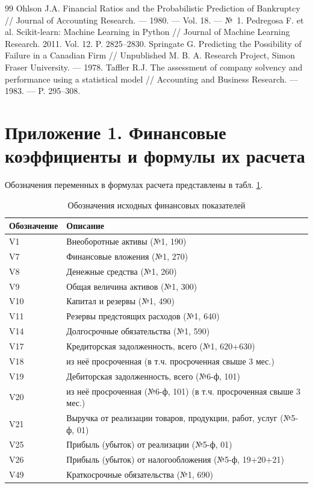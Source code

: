 \documentclass[14pt,a4paper]{extarticle}
\begin{document}
\begin{thebibliography}{99}
 Ohlson J.A. Financial Ratios and the Probabilistic Prediction of Bankruptcy // Journal of Accounting Research. --- 1980. --- Vol. 18. --- №~1.
 Pedregosa F. et al. Scikit-learn: Machine Learning in Python // Journal of Machine Learning Research. 2011. Vol. 12. P. 2825–2830.
 Springate G. Predicting the Possibility of Failure in a Canadian Firm // Unpublished M. B. A. Research Project, Simon Fraser University. --- 1978.
 Taffler R.J. The assessment of company solvency and performance using a statistical model // Accounting and Business Research. --- 1983. --- P. 295--308.
\end{thebibliography}

\clearpage

\appendix
\section*{Приложение 1. Финансовые коэффициенты и формулы их расчета}

Обозначения переменных в формулах расчета представлены в табл. \ref{tab:app1}.

\begin{table}[H]
\centering
\caption{Обозначения исходных финансовых показателей}
\label{tab:app1}
\small
\begin{tabular}{l|l}
\toprule
Обозначение & Описание \\
\midrule
V1 & Внеоборотные активы (№1, 190) \\
V7 & Финансовые вложения (№1, 270) \\
V8 & Денежные средства (№1, 260) \\
V9 & Общая величина активов (№1, 300) \\
V10 & Капитал и резервы (№1, 490) \\
V11 & Резервы предстоящих расходов (№1, 640) \\
V14 & Долгосрочные обязательства (№1, 590) \\
V17 & Кредиторская задолженность, всего (№1, 620+630) \\
V18 & из неё просроченная (в т.ч. просроченная свыше 3 мес.) \\
V19 & Дебиторская задолженность, всего (№6-ф, 101) \\
V20 & из неё просроченная (№6-ф, 101) (в т.ч. просроченная свыше 3 мес.) \\
V21 & Выручка от реализации товаров, продукции, работ, услуг (№5-ф, 01) \\
V25 & Прибыль (убыток) от реализации (№5-ф, 01) \\
V26 & Прибыль (убыток) от налогообложения (№5-ф, 19+20+21) \\
V49 & Краткосрочные обязательства (№1, 690) \\
\bottomrule
\end{tabular}
\end{table}
\end{document}
